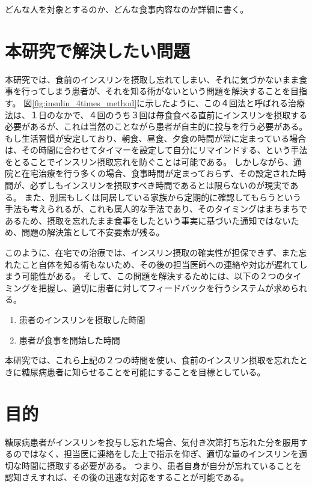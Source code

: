 どんな人を対象とするのか、どんな食事内容なのか詳細に書く。

\section{本研究で解決したい問題}
\label{section:problem}

本研究では、食前のインスリンを摂取し忘れてしまい、それに気づかないまま食事を行ってしまう患者が、それを知る術がないという問題を解決することを目指す。
図\ref{fig:insulin_4times_method}に示したように、この４回法と呼ばれる治療法は、１日のなかで、４回のうち３回は毎食食べる直前にインスリンを摂取する必要があるが、これは当然のことながら患者が自主的に投与を行う必要がある。
もし生活習慣が安定しており、朝食、昼食、夕食の時間が常に定まっている場合は、その時間に合わせてタイマーを設定して自分にリマインドする、という手法をとることでインスリン摂取忘れを防ぐことは可能である。
しかしながら、通院と在宅治療を行う多くの場合、食事時間が定まっておらず、その設定された時間が、必ずしもインスリンを摂取すべき時間であるとは限らないのが現実である。
また、別居もしくは同居している家族から定期的に確認してもらうという手法も考えられるが、これも属人的な手法であり、そのタイミングはまちまちであるため、摂取を忘れたまま食事をしたという事実に基づいた通知ではないため、問題の解決策として不安要素が残る。

このように、在宅での治療では、インスリン摂取の確実性が担保できず、また忘れたこと自体を知る術もないため、その後の担当医師への連絡や対応が遅れてしまう可能性がある。
そして、この問題を解決するためには、以下の２つのタイミングを把握し、適切に患者に対してフィードバックを行うシステムが求められる。

\begin{enumerate}
  \item 患者のインスリンを摂取した時間
  \item 患者が食事を開始した時間
\end{enumerate}

本研究では、これら上記の２つの時間を使い、食前のインスリン摂取を忘れたときに糖尿病患者に知らせることを可能にすることを目標としている。

\section{目的}
\label{section:purpose}

糖尿病患者がインスリンを投与し忘れた場合、気付き次第打ち忘れた分を服用するのではなく、担当医に連絡をした上で指示を仰ぎ、適切な量のインスリンを適切な時間に摂取する必要がある。
つまり、患者自身が自分が忘れていることを認知さえすれば、その後の迅速な対応をすることが可能である。

